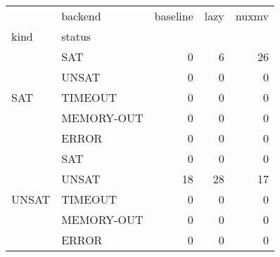 \begin{tabular}{llrrr}
\toprule
 & backend & baseline & lazy & nuxmv \\
kind & status &  &  &  \\
\midrule
\multirow[c]{5}{*}{SAT} & SAT & 0 & 6 & 26 \\
 & UNSAT & 0 & 0 & 0 \\
 & TIMEOUT & 0 & 0 & 0 \\
 & MEMORY-OUT & 0 & 0 & 0 \\
 & ERROR & 0 & 0 & 0 \\
\multirow[c]{5}{*}{UNSAT} & SAT & 0 & 0 & 0 \\
 & UNSAT & 18 & 28 & 17 \\
 & TIMEOUT & 0 & 0 & 0 \\
 & MEMORY-OUT & 0 & 0 & 0 \\
 & ERROR & 0 & 0 & 0 \\
\bottomrule
\end{tabular}

